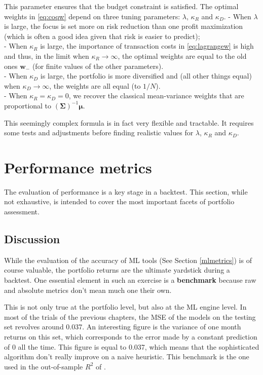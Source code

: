 \documentclass[]{krantz}
\theoremstyle{definition}
\theoremstyle{definition}
\theoremstyle{definition}
\theoremstyle{remark}
\begin{document}
This parameter ensures that the budget constraint is satisfied. The
optimal weights in \eqref{eq:coqw} depend on three tuning parameters:
\(\lambda\), \(\kappa_R\) and \(\kappa_D\). - When \(\lambda\) is large,
the focus is set more on risk reduction than one profit maximization
(which is often a good idea given that risk is easier to predict);\\
- When \(\kappa_R\) is large, the importance of transaction costs in
\eqref{eq:lagrangew} is high and thus, in the limit when
\(\kappa_R \rightarrow \infty\), the optimal weights are equal to the
old ones \(\textbf{w}_-\) (for finite values of the other parameters).\\
- When \(\kappa_D\) is large, the portfolio is more diversified and (all
other things equal) when \(\kappa_D \rightarrow \infty\), the weights
are all equal (to \(1/N\)).\\
- When \(\kappa_R=\kappa_D=0\), we recover the classical mean-variance
weights that are proportional to
\((\boldsymbol{\Sigma})^{-1} \boldsymbol{\mu}\).

This seemingly complex formula is in fact very flexible and tractable.
It requires some tests and adjustments before finding realistic values
for \(\lambda\), \(\kappa_R\) and \(\kappa_D\).

\hypertarget{perfmet}{%
\section{Performance metrics}\label{perfmet}}

The evaluation of performance is a key stage in a backtest. This
section, while not exhaustive, is intended to cover the most important
facets of portfolio assessment.

\hypertarget{discussion-1}{%
\subsection{Discussion}\label{discussion-1}}

While the evaluation of the accuracy of ML tools (See Section
\ref{mlmetrics}) is of course valuable, the portfolio returns are the
ultimate yardstick during a backtest. One essential element in such an
exercise is a \textbf{benchmark} because raw and absolute metrics don't
mean much one their own.

This is not only true at the portfolio level, but also at the ML engine
level. In most of the trials of the previous chapters, the MSE of the
models on the testing set revolves around 0.037. An interesting figure
is the variance of one month returns on this set, which corresponds to
the error made by a constant prediction of 0 all the time. This figure
is equal to 0.037, which means that the sophisticated algorithm don't
really improve on a naive heuristic. This benchmark is the one used in
the out-of-sample \(R^2\) of \citet{gu2018empirical}.
\end{document}
